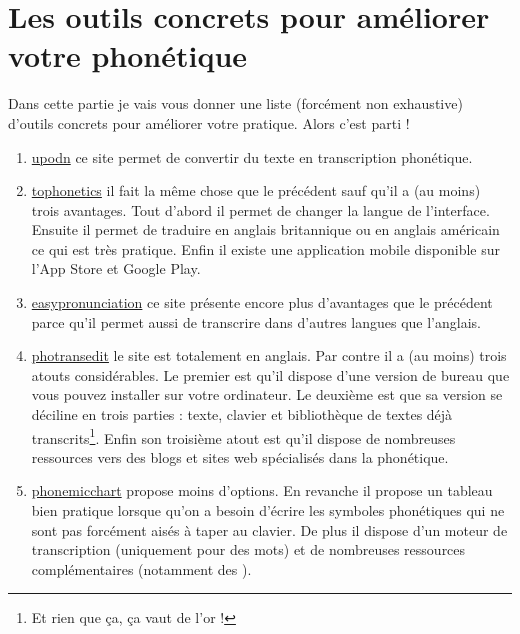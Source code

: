 \chapter{Les outils concrets pour améliorer votre phonétique}

Dans cette partie je vais vous donner une liste (forcément non
exhaustive) d'outils concrets pour améliorer votre pratique. Alors
c'est parti !

\begin{enumerate}
\item \href{http://upodn.com/}{upodn} ce site permet de convertir du
  texte en transcription phonétique.
\item \href{https://tophonetics.com/}{tophonetics} il fait la même
  chose que le précédent sauf qu'il a (au moins) trois avantages. Tout
  d'abord il permet de changer la langue de l'interface. Ensuite il
  permet de traduire en anglais britannique ou en anglais américain ce
  qui est très pratique. Enfin il existe une application mobile
  disponible sur l'App Store et Google Play.
\item \href{https://easypronunciation.com/fr/}{easypronunciation} ce
  site présente encore plus d'avantages que le précédent parce qu'il
  permet aussi de transcrire dans d'autres langues que l'anglais.
\item \href{http://www.photransedit.com/}{photransedit} le site est
  totalement en anglais. Par contre il a (au moins) trois atouts
  considérables. Le premier est qu'il dispose d'une version de bureau
  que vous pouvez installer sur votre ordinateur. Le deuxième est que
  sa version  se déciline en trois parties : texte,
  clavier et bibliothèque de textes déjà transcrits\footnote{Et rien
    que ça, ça vaut de l'or !}. Enfin son troisième atout est qu'il
  dispose de nombreuses ressources vers des blogs et sites web
  spécialisés dans la phonétique.
\item \href{http://www.phonemicchart.com/}{phonemicchart} propose
  moins d'options. En revanche il propose un tableau bien pratique
  lorsque qu'on a besoin d'écrire les symboles phonétiques qui ne sont
  pas forcément aisés à taper au clavier. De plus il dispose d'un
  moteur de transcription (uniquement pour des mots) et de nombreuses
  ressources complémentaires (notamment des ).
\end{enumerate}

\newpage

